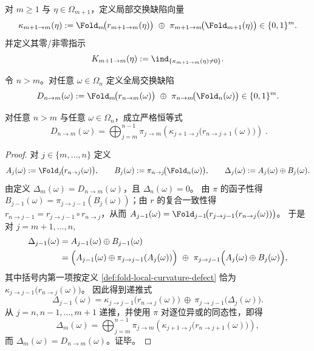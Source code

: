 \begin{definition}[局部交换缺陷与曲率指示]\label{def:fold-local-curvature-defect}
对 \(m\ge 1\) 与 \(\eta\in\Omega_{m+1}\)，定义局部交换缺陷向量
\[
\kappa_{m+1\to m}(\eta)
:=\Fold_m\!\bigl(r_{m+1\to m}(\eta)\bigr)\ \oplus\ \pi_{m+1\to m}\!\bigl(\Fold_{m+1}(\eta)\bigr)
\in \{0,1\}^{m}.
\]
并定义其零/非零指示
\[
K_{m+1\to m}(\eta):=\ind_{\{\kappa_{m+1\to m}(\eta)\neq 0\}}.
\]
\end{definition}

\begin{definition}[全局交换缺陷]\label{def:fold-global-stokes-defect}
令 \(n>m\)。对任意 \(\omega\in\Omega_n\) 定义全局交换缺陷
\[
D_{n\to m}(\omega)
:=\Fold_m\!\bigl(r_{n\to m}(\omega)\bigr)\ \oplus\ \pi_{n\to m}\!\bigl(\Fold_n(\omega)\bigr)
\in \{0,1\}^{m}.
\]
\end{definition}

\begin{theorem}[折叠--截断塔上的离散广义斯托克斯恒等式]\label{thm:fold-discrete-stokes-defect}
对任意 \(n>m\) 与任意 \(\omega\in\Omega_n\)，成立严格恒等式
\[
\boxed{\;
D_{n\to m}(\omega)
=\bigoplus_{j=m}^{n-1}
\pi_{j\to m}\!\left(
\kappa_{j+1\to j}\!\bigl(r_{n\to j+1}(\omega)\bigr)
\right)\; }.
\]
\end{theorem}

\begin{proof}
对 \(j\in\{m,\dots,n\}\) 定义
\[
A_j(\omega):=\Fold_j\!\bigl(r_{n\to j}(\omega)\bigr),\qquad
B_j(\omega):=\pi_{n\to j}\!\bigl(\Fold_n(\omega)\bigr),\qquad
\Delta_j(\omega):=A_j(\omega)\oplus B_j(\omega).
\]
由定义 \(\Delta_m(\omega)=D_{n\to m}(\omega)\)，且 \(\Delta_n(\omega)=0\)。
由 \(\pi\) 的函子性得 \(B_{j-1}(\omega)=\pi_{j\to j-1}(B_j(\omega))\)；由 \(r\) 的复合一致性得 \(r_{n\to j-1}=r_{j\to j-1}\circ r_{n\to j}\)，从而
\(
A_{j-1}(\omega)=\Fold_{j-1}\!\bigl(r_{j\to j-1}(r_{n\to j}(\omega))\bigr)
\)。
于是对 \(j=m+1,\dots,n\),
\[
\begin{aligned}
\Delta_{j-1}(\omega)
&=A_{j-1}(\omega)\oplus B_{j-1}(\omega)\\
&=\Bigl(A_{j-1}(\omega)\oplus \pi_{j\to j-1}(A_j(\omega))\Bigr)\ \oplus\ \pi_{j\to j-1}\Bigl(A_j(\omega)\oplus B_j(\omega)\Bigr),
\end{aligned}
\]
其中括号内第一项按定义 \ref{def:fold-local-curvature-defect} 恰为
\(
\kappa_{j\to j-1}\!\bigl(r_{n\to j}(\omega)\bigr)
\)。
因此得到递推式
\[
\Delta_{j-1}(\omega)
=\kappa_{j\to j-1}\!\bigl(r_{n\to j}(\omega)\bigr)\ \oplus\ \pi_{j\to j-1}\!\bigl(\Delta_j(\omega)\bigr).
\]
从 \(j=n,n-1,\dots,m+1\) 递推，并使用 \(\pi\) 对逐位异或的同态性，即得
\[
\Delta_m(\omega)=\bigoplus_{j=m}^{n-1}\pi_{j\to m}\!\left(\kappa_{j+1\to j}\!\bigl(r_{n\to j+1}(\omega)\bigr)\right),
\]
而 \(\Delta_m(\omega)=D_{n\to m}(\omega)\)。证毕。
\end{proof}



